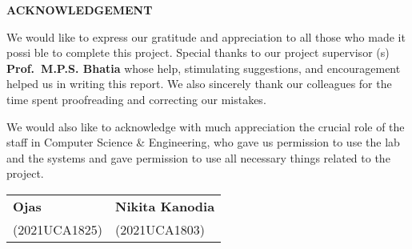 \thispagestyle{plain}
\begin{center}
\large \large \textbf{ACKNOWLEDGEMENT}
\end{center}

\vspace{0.3cm}
\noindent
\fontsize{13pt}{24pt}\selectfont We would like to express our gratitude and appreciation to all those who made it possi
ble to complete this project. Special thanks to our project supervisor (s) \textbf{Prof.\ M.P.S. Bhatia}
 whose help, stimulating suggestions, and encouragement helped us in writing this report.
 We also sincerely thank our colleagues for the time spent proofreading and correcting our
 mistakes.

 We would also like to acknowledge with much appreciation the crucial role of the staff
 in Computer Science \& Engineering, who gave us permission to use the lab and the systems
 and gave permission to use all necessary things related to the project.

 \vspace{4.0cm}

 \begin{tabu} to \textwidth { X[l] X[c] }

    \textbf{Ojas} & \textbf{Nikita Kanodia} \\
    (2021UCA1825) & (2021UCA1803) \\
    
   
\end{tabu}








\newpage